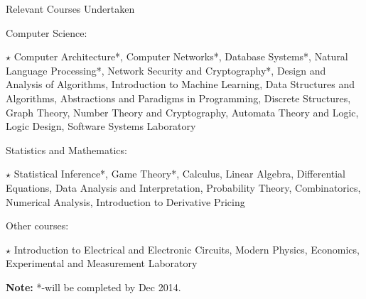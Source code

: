 \documentclass{resume2} %
\begin{document}
\begin{rSection}{Relevant Courses Undertaken}
\begin{rSubsection}{Computer Science:}{}{}{}
\item[$\star$] Computer Architecture*, Computer Networks*, Database Systems*, Natural Language Processing*, Network Security and Cryptography*, Design and Analysis of Algorithms, Introduction to Machine Learning, Data Structures and Algorithms, Abstractions and
Paradigms in Programming, Discrete Structures, Graph Theory, Number Theory and Cryptography, Automata Theory and Logic, Logic
Design, Software Systems Laboratory

\end{rSubsection}

\begin{rSubsection}{Statistics and Mathematics:}{}{}{}
\item[$\star$] Statistical Inference*, Game Theory*, Calculus, Linear Algebra, Differential Equations, Data Analysis and Interpretation, Probability Theory, Combinatorics, Numerical Analysis, Introduction to Derivative Pricing
\end{rSubsection}

\begin{rSubsection}{Other courses:}{}{}{}
\item[$\star$] Introduction to Electrical and Electronic Circuits, Modern Physics, Economics, Experimental and Measurement Laboratory
\end{rSubsection}

\textbf{Note:} *-will be completed by Dec 2014.
\end{rSection}
\end{document}
